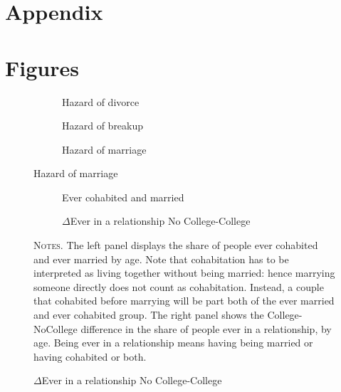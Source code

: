 \documentclass[12pt]{article}
\begin{document}
\section*{Appendix}
\section{Figures}
\begin{figure}[h!]
\caption{---Hazards by duration of spells: simulations and data}
\label{fig:haz}
\begin{center}
\begin{subfigure}{.49\textwidth}
\centering
\caption{Hazard of divorce}
\label{fig:hazd}
\scalebox{0.49}{} 
\end{subfigure}
\begin{subfigure}{.49\textwidth}
\centering
\caption{Hazard of breakup}
\label{fig:hazs}
\scalebox{0.49}{} 
\end{subfigure}
\end{center}
\begin{center}
\begin{subfigure}{.49\textwidth}
\centering
\caption{Hazard of marriage}
\label{fig:hazm}
\scalebox{0.49}{} 
\end{subfigure}
\end{center}
\end{figure}
\begin{figure}[h!]
\caption{---Ever in a relationship by age: simulations and data}
\label{fig:relations}

\begin{subfigure}{.49\textwidth}
\centering
\caption{Ever cohabited and married}
\label{fig:sub-firs1t1}
\scalebox{0.5}{ } 
\end{subfigure}
\begin{subfigure}{.49\textwidth}
\centering
\caption{$\Delta$Ever in a relationship No College-College}
\label{fig:sub-second11}
\scalebox{0.5}{ } 
\end{subfigure}



\begin{minipage}{0.99\textwidth} %

\hspace{50em}

{\footnotesize \textsc{Notes.} The left panel displays the share of people ever cohabited and ever married by age. Note that cohabitation has to be interpreted as living together without being married: hence marrying someone directly does not count as cohabitation. Instead, a couple that cohabited before marrying will be part both of the ever married and ever cohabited group. The right panel shows the College-NoCollege difference in the share of people ever in a relationship, by age. Being ever in a relationship means having being married or having cohabited or both.\par}
\end{minipage}
\end{figure}
\end{document}
